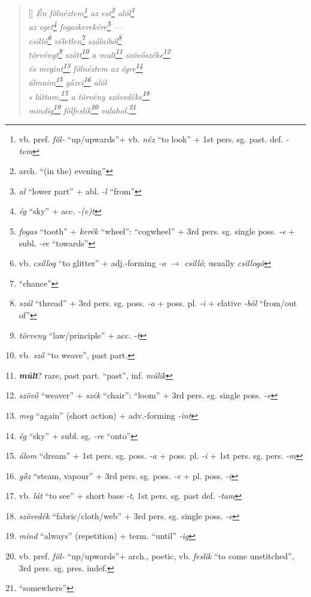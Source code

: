 \documentclass[a4paper,12pt,twoside,final]{book}
\begin{document}
\begin{verse}[\versewidth]
  \it
  Én fölnéztem\footnote{vb. pref. \emph{föl-} ``up/upwards''+ vb.
  \emph{néz} ``to look'' + 1st pers. sg. past. def. \emph{-tem}} az
  est\footnote{arch. ``(in the) evening''} alól\footnote{\emph{al}
  ``lower part'' + abl. \emph{-l} ``from''} \\
  az eget\footnote{\emph{ég} ``sky'' + acc. \emph{-(e)t}}
  fogaskerekére\footnote{\emph{fogas} ``tooth'' +
  \emph{kerék} ``wheel'': ``cogwheel'' + 3rd pers. sg. single
  poss. \emph{-e} + subl. \emph{-re} ``towards''} --- \\
  csilló\footnote{vb. \emph{csillog} ``to glitter'' +
  adj.-forming \emph{-o} $\rightarrow$
  \emph{csilló}; usually \emph{csillogó}}
  véletlen\footnote{``chance''} szálaiból\footnote{\emph{szál}
  ``thread'' + 3rd pers. sg. poss. \emph{-a} + poss. pl. \emph{-i} +
  elative \emph{-ból} ``from/out of''} \\
  törvényt\footnote{\emph{törveny} ``law/principle'' + acc. \emph{-t}}
  szőtt\footnote{vb. \emph{sző} ``to weave'', past part.} a
  mult\footnote{\textbf{\emph{múlt}}? rare, past part. ``past'',
  inf. \emph{múlik}}
  szövőszéke\footnote{\emph{szövő} ``weaver'' + \emph{szék} ``chair'':
  ``loom'' + 3rd pers. sg. single poss. \emph{-e}} \\
  és megint\footnote{\emph{meg} ``again'' (short action) +
  adv.-forming \emph{-int}} fölnéztem az égre\footnote{\emph{ég}
  ``sky'' + subl. sg. \emph{-re} ``onto''} \\
  álmaim\footnote{\emph{álom} ``dream'' +
  1st pers. sg. poss. \emph{-a} + poss. pl. \emph{-i} + 1st
  pers. sg. pers. \emph{-m}} gőzei\footnote{\emph{gőz} ``steam,
  vapour'' + 3rd pers. sg. poss. \emph{-e} + pl. poss. \emph{-i}} alól \\
  s láttam,\footnote{vb. \emph{lát} ``to see'' +
  short base \emph{-t}, 1st pers. sg. past def. \emph{-tam}} a törvény
  szövedéke\footnote{\emph{szövedék} ``fabric/cloth/web'' + 3rd
  pers. sg. single poss. \emph{-e}} \\
  mindig\footnote{\emph{mind} ``always'' (repetition) + term. ``until''
  \emph{-ig}} fölfeslik\footnote{vb. pref. \emph{föl-} ``up/upwards''+
  arch., poetic, vb.
  \emph{feslik} ``to come unstitched'', 3rd pers. sg. pres. indef.}
  valahol.\footnote{``somewhere''}
\end{verse}

\newpage


\settowidth{\versewidth}{The silence listened intently --- One struck.}
\end{document}
